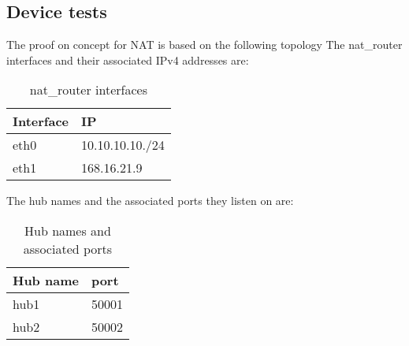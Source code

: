 {{\subsection{Device tests}
\label{sub-sec:nat-tests}
The proof on concept for NAT is based on the following topology
The nat_router interfaces and their associated IPv4 addresses are:
\begin{center}
  \begin{table}[htb]
  \begin{center}
  \begin{tabular}{| l | l | }
    \hline
      Interface & IP \\ \hline
      eth0 & 10.10.10.10./24 \\ \hline
      eth1 & 168.16.21.9\\ \hline
    \hline
  \end{tabular}
  \end{center}
  \caption{nat_router interfaces}
  \label{table:nat-top}
  \end{table}
\end{center}
The hub names and the associated ports they listen on are:
\begin{center}
  \begin{table}[htb]
  \begin{center}
  \begin{tabular}{| l | l | }
    \hline
      Hub name & port \\ \hline
      hub1 & 50001 \\ \hline
      hub2 & 50002\\ \hline
    \hline
  \end{tabular}
  \end{center}
  \caption{Hub names and associated ports}
  \label{table:nat-hubs}
  \end{table}
\end{center}

}}
